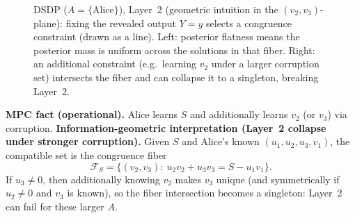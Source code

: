 \documentclass[11pt,a4paper]{article}
\theoremstyle{definition}
\theoremstyle{plain}
\begin{document}
\begin{description}
    \begin{figure}[ht]
    \centering
    \begin{minipage}[t]{0.48\textwidth}
    \centering
    \end{minipage}
    \hfill
    \begin{minipage}[t]{0.48\textwidth}
    \centering
    \end{minipage}
    \caption{DSDP ($A=\{\mathrm{Alice}\}$), Layer~2 (geometric intuition in the $(v_2,v_3)$-plane): fixing the revealed output $Y=y$ selects a congruence constraint (drawn as a line).
    Left: posterior flatness means the posterior mass is uniform across the solutions in that fiber.
    Right: an additional constraint (e.g.\ learning $v_2$ under a larger corruption set) intersects the fiber and can collapse it to a singleton, breaking Layer~2.}
    \label{fig:dsdp-alice-layer2}
    \end{figure}

    \item[\textbf{$\pi_{\{\mathrm{Alice},\mathrm{Bob}\}}:E\to B_{\{\mathrm{Alice},\mathrm{Bob}\}}$ and $\pi_{\{\mathrm{Alice},\mathrm{Charlie}\}}:E\to B_{\{\mathrm{Alice},\mathrm{Charlie}\}}$.}]
    \textbf{MPC fact (operational).} Alice learns $S$ and additionally learns $v_2$ (or $v_3$) via corruption.
    \textbf{Information-geometric interpretation (Layer~2 collapse under stronger corruption).}
    Given $S$ and Alice's known $(u_1,u_2,u_3,v_1)$, the compatible set is the congruence fiber
    \[
    \mathcal{F}_S=\{(v_2,v_3):\ u_2v_2+u_3v_3=S-u_1v_1\}.
    \]
    If $u_3\neq 0$, then additionally knowing $v_2$ makes $v_3$ unique (and symmetrically if $u_2\neq 0$ and $v_3$ is known), so the fiber intersection becomes a singleton: Layer~2 can fail for these larger $A$.


\end{description}
\end{document}
